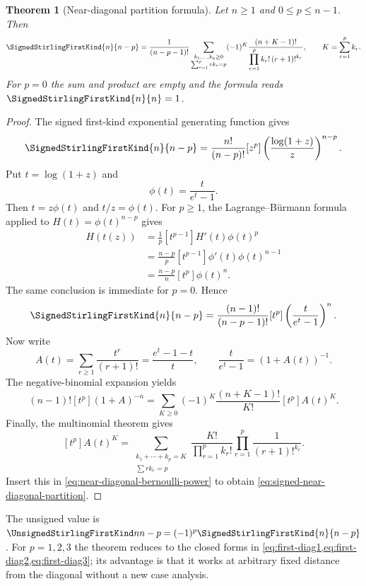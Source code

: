 \documentclass[11pt,a4paper,oneside,openany]{book}
\newtheorem{theorem}{Theorem}[chapter]
\theoremstyle{definition}
\theoremstyle{remark}
\begin{document}
\begin{theorem}[Near-diagonal partition formula]
\label{thm:signed-near-diagonal-partition}
Let $n\ge1$ and $0\le p\le n-1$.  Then
\begin{equation}
\label{eq:signed-near-diagonal-partition}
 \SignedStirlingFirstKind{n}{n-p}=\frac{1}{(n-p-1)!}
 \sum_{\substack{k_1,\ldots,k_p\ge0\\
                  \sum_{r=1}^{p}r k_r=p}}
 (-1)^K
 \frac{(n+K-1)!}
 {\displaystyle\prod_{r=1}^{p}k_r!\,(r+1)!^{k_r}},
 \qquad K=\sum_{r=1}^{p}k_r.
\end{equation}
For $p=0$ the sum and product are empty and the formula reads $\SignedStirlingFirstKind{n}{n}=1$.
\end{theorem}
\begin{proof}
The signed first-kind exponential generating function gives
\begin{equation}
\label{eq:near-diagonal-log-coefficient}
 \SignedStirlingFirstKind{n}{n-p}=\frac{n!}{(n-p)!}
 [z^p]\left(\frac{\log(1+z)}{z}\right)^{n-p}.
\end{equation}
Put $t=\log(1+z)$ and
\[
 \phi(t)=\frac{t}{e^t-1}.
\]
Then $t=z\phi(t)$ and $t/z=\phi(t)$.  For $p\ge1$, the
Lagrange--B\"urmann formula applied to $H(t)=\phi(t)^{n-p}$ gives
\begin{align*}
 [z^p]H(t(z))
 &=\frac1p[t^{p-1}]H'(t)\phi(t)^p\\
 &=\frac{n-p}{p}[t^{p-1}]\phi'(t)\phi(t)^{n-1}\\
 &=\frac{n-p}{n}[t^p]\phi(t)^n.
\end{align*}
The same conclusion is immediate for $p=0$.  Hence
\begin{equation}
\label{eq:near-diagonal-bernoulli-power}
 \SignedStirlingFirstKind{n}{n-p}=\frac{(n-1)!}{(n-p-1)!}
 [t^p]\left(\frac{t}{e^t-1}\right)^n.
\end{equation}
Now write
\[
 A(t)=\sum_{r\ge1}\frac{t^r}{(r+1)!}
     =\frac{e^t-1-t}{t},
 \qquad \frac{t}{e^t-1}=(1+A(t))^{-1}.
\]
The negative-binomial expansion yields
\[
 (n-1)![t^p](1+A)^{-n}
 =\sum_{K\ge0}(-1)^K\frac{(n+K-1)!}{K!}[t^p]A(t)^K.
\]
Finally, the multinomial theorem gives
\[
 [t^p]A(t)^K
 =\sum_{\substack{k_1+\cdots+k_p=K\\
                   \sum r k_r=p}}
   \frac{K!}{\prod_{r=1}^{p}k_r!}
   \prod_{r=1}^{p}\frac1{(r+1)!^{k_r}}.
\]
Insert this in \eqref{eq:near-diagonal-bernoulli-power} to obtain
\eqref{eq:signed-near-diagonal-partition}.
\end{proof}

The unsigned value is
$\UnsignedStirlingFirstKind n{n-p}=(-1)^p \SignedStirlingFirstKind{n}{n-p}$.  For $p=1,2,3$ the theorem reduces to the
closed forms in \cref{eq:first-diag1,eq:first-diag2,eq:first-diag3}; its advantage is that it works
at arbitrary fixed distance from the diagonal without a new case analysis.
\end{document}
